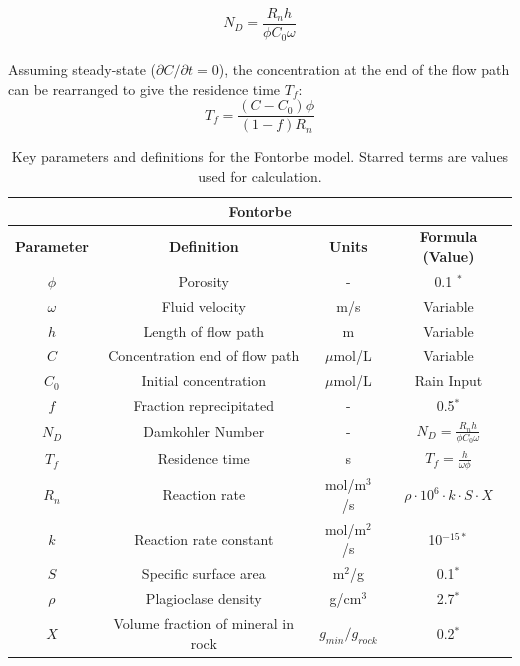 \begin{equation}
    N_D = \frac{R_n h}{\phi C_0 \omega}
\end{equation}\\

Assuming steady-state (\(\partial C/\partial t = 0\)), the concentration at the end of the flow path can be rearranged to give the residence time \(T_f\):\\

\begin{equation}
    T_f = \frac{(C - C_0)\phi}{(1-f)R_n}
\end{equation}


\begin{table}[H]
    \centering
    \renewcommand{\arraystretch}{1.3} %
    \begin{tabular}{|c|c|c|c|}
        \hline
        \multicolumn{4}{|c|}{\textbf{Fontorbe}} \\  
        \hline
        \textbf{Parameter} & \textbf{Definition} & \textbf{Units} & \textbf{Formula (Value)} \\  
        \hline
        $\phi$ & Porosity & - & 0.1 $^*$\\
        $\omega$ & Fluid velocity & m/s & Variable \\
        $h$ & Length of flow path & m & Variable \\
        $C$ & Concentration \@ end of flow path & $\mu$mol/L & Variable \\
        $C_0$ & Initial concentration & $\mu$mol/L & Rain Input \\
        $f$ & Fraction reprecipitated & - & 0.5$^*$ \\
        $N_D$ & Damkohler Number & - & $N_D = \frac{R_n h}{\phi C_0 \omega}$ \\
        $T_f$ & Residence time & s & $T_f = \frac{h}{\omega\phi}$ \\
        $R_n$ & Reaction rate & mol/m$^3$/s & $\rho \cdot 10^6 \cdot k \cdot S \cdot X $ \\
        $k$ & Reaction rate constant & mol/m$^2$/s & 10$^{-15*}$ \\
        $S$ & Specific surface area & m$^2$/g & 0.1$^*$ \\
        $\rho$ & Plagioclase density & g/cm$^3$ & 2.7$^*$ \\
        $X$ & Volume fraction of mineral in rock & $g_{min}/g_{rock}$ & 0.2$^*$ \\
        \hline
    \end{tabular}
    \caption{Key parameters and definitions for the Fontorbe model. Starred terms are values used for calculation.}
    \label{tab:parameters1}
\end{table}


